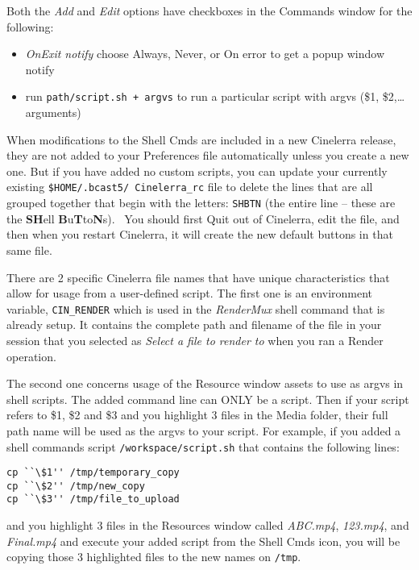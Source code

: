Both the \textit{Add} and \textit{Edit} options have checkboxes in the Commands window for the following:

\begin{itemize}[nosep]
	\item \textit{OnExit notify} \quad  choose Always, Never, or On error to get a popup window notify
	\item run \texttt{path/script.sh + argvs} \quad to run a particular script with argvs (\$1, \$2,{\dots} arguments)
\end{itemize}


When modifications to the Shell Cmds are included in a new Cinelerra release, they are not added to your Preferences file automatically unless you create a new one. But if you have added no custom scripts, you can update your currently existing \texttt{\$HOME/.bcast5/ Cinelerra\_rc} file to delete the lines that are all grouped together that begin with the letters: \texttt{SHBTN} (the entire line -- these are the \textbf{SH}ell \textbf{B}u\textbf{T}to\textbf{N}s). \ You should first Quit out of Cinelerra, edit the file, and then when you restart Cinelerra, it will create the new default buttons in that same file.

There are 2 specific Cinelerra file names that have unique characteristics that allow for usage from a user-defined
script. The first one is an environment variable, \texttt{CIN\_RENDER} which is used in the \textit{RenderMux} shell command that is already setup. It contains the complete path and filename of the file in your session that you selected as \textit{Select a file to render to} when you ran a Render operation.

The second one concerns usage of the Resource window assets to use as argvs in shell scripts. The added command line
can ONLY be a script. Then if your script refers to \$1, \$2 and \$3 and you highlight 3 files in the Media folder,
their full path name will be used as the argvs to your script. For example, if you added a shell commands script
\texttt{/workspace/script.sh} that contains the following lines:

\begin{lstlisting}[numbers=none,xleftmargin=10mm]
cp ``\$1'' /tmp/temporary_copy
cp ``\$2'' /tmp/new_copy
cp ``\$3'' /tmp/file_to_upload
\end{lstlisting}

and you highlight 3 files in the Resources window called\textit{ ABC.mp4}, \textit{123.mp4}, and \textit{Final.mp4} and execute your added script from the Shell Cmds icon, you will be copying those 3 highlighted files to the new names on \texttt{/tmp}.

